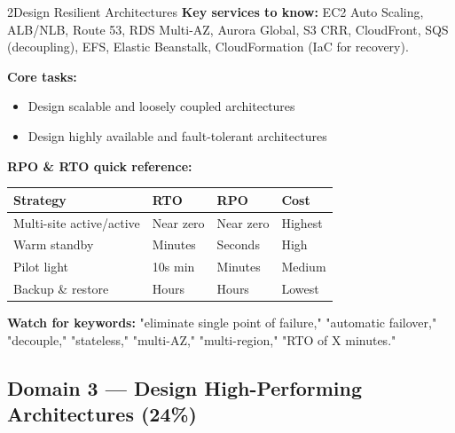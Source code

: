 \begin{domainsummary}{2}{Design Resilient Architectures}
\textbf{Key services to know:} EC2 Auto Scaling, ALB/NLB, Route 53, RDS Multi-AZ,
Aurora Global, S3 CRR, CloudFront, SQS (decoupling), EFS, Elastic Beanstalk,
CloudFormation (IaC for recovery).

\textbf{Core tasks:}
\begin{itemize}
  \item Design scalable and loosely coupled architectures
  \item Design highly available and fault-tolerant architectures
\end{itemize}

\textbf{RPO \& RTO quick reference:}
\begin{comparebox}[title={DR strategies — fastest/costliest to slowest/cheapest}]
\begin{tabular}{@{}p{3.5cm}p{3cm}p{3cm}p{3.5cm}@{}}
\toprule
\textbf{Strategy} & \textbf{RTO} & \textbf{RPO} & \textbf{Cost} \\
\midrule
Multi-site active/active & Near zero  & Near zero & Highest \\
Warm standby             & Minutes    & Seconds   & High    \\
Pilot light              & 10s min    & Minutes   & Medium  \\
Backup \& restore        & Hours      & Hours     & Lowest  \\
\bottomrule
\end{tabular}
\end{comparebox}

\textbf{Watch for keywords:} "eliminate single point of failure," "automatic failover,"
"decouple," "stateless," "multi-AZ," "multi-region," "RTO of X minutes."
\end{domainsummary}

\subsection{Domain 3 — Design High-Performing Architectures (24\%)}

